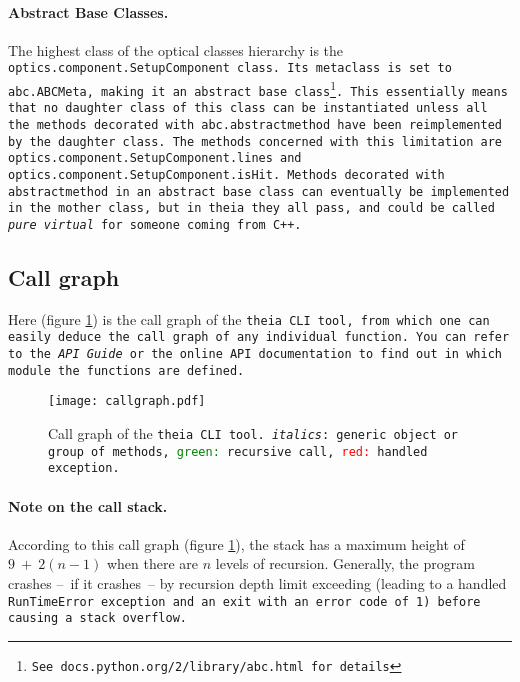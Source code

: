 \documentclass{article}
\begin{document}
\paragraph{Abstract Base Classes.}The highest class of the optical classes hierarchy is the \\ \tt{optics.component.SetupComponent} class. Its metaclass is set to \tt{abc.ABCMeta}, making it an abstract base class\footnote{See \tt{docs.python.org/2/library/abc.html} for details}. This essentially means that no daughter class of this class can be instantiated unless all the methods decorated with \tt{abc.abstractmethod} have been reimplemented by the daughter class. The methods concerned with this limitation are \tt{optics.component.SetupComponent.lines} and \tt{optics.component.SetupComponent.isHit}. Methods decorated with \tt{abstractmethod} in an abstract base class can eventually be implemented in the mother class, but in theia they all \tt{pass}, and could be called \textit{pure virtual} for someone coming from C++.

\subsection{Call graph}
Here (figure \ref{callgraph}) is the call graph of the \tt{theia} CLI tool, from which one can easily deduce the call graph of any individual function. You can refer to the \textit{API Guide} or the online API documentation to find out in which module the functions are defined.


\begin{figure}[h]
\begin{center}
\texttt{[image: callgraph.pdf]}
\end{center}
\caption{Call graph of the \tt{theia} CLI tool. \textit{italics}: generic object or group of methods, \textcolor{green}{green:} recursive call, \textcolor{red}{red:} handled exception.}
\label{callgraph}
\end{figure}



\paragraph{Note on the  call stack.}According to this call graph (figure \ref{callgraph}), the stack has a maximum height of $9~+~2(n-1)$ when there are $n$ levels of recursion. Generally, the program crashes --~if it crashes~-- by recursion depth limit exceeding (leading to a handled \tt{RunTimeError} exception and an exit with an error code of 1) before causing a stack overflow.
\end{document}
